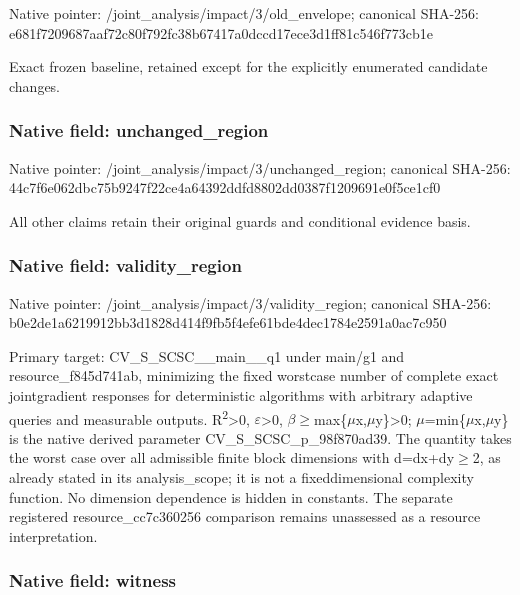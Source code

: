 \documentclass[10pt,a4paper]{article}
\begin{document}
Native pointer: /joint\_analysis/impact/3/old\_envelope; canonical SHA-256: e681f7209687aaf72c80f792\allowbreak{}fc38b67417a0dccd17ece3d1\allowbreak{}ff81c546f773cb1e


Exact frozen baseline, retained except for the explicitly enumerated candidate changes.


\subsubsection{Native field: unchanged\_region}


Native pointer: /joint\_analysis/impact/3\allowbreak{}/unchanged\_region; canonical SHA-256: 44c7f6e062dbc75b9247f22c\allowbreak{}e4a64392ddfd8802dd0387f1\allowbreak{}209691e0f5ce1cf0


All other claims retain their original guards and conditional evidence basis.


\subsubsection{Native field: validity\_region}


Native pointer: /joint\_analysis/impact/3\allowbreak{}/validity\_region; canonical SHA-256: b0e2de1a6219912bb3d1828d\allowbreak{}414f9fb5f4efe61bde4dec17\allowbreak{}84e2591a0ac7c950


Primary target: CV\_S\_SCSC\_\_main\_\_q1 under main/g1 and resource\_f845d741ab, minimizing the fixed worstcase number of complete exact jointgradient responses for deterministic algorithms with arbitrary adaptive queries and measurable outputs. R\textsuperscript{2}>0, \ensuremath{\varepsilon}>0, \ensuremath{\beta}\ensuremath{\ge}max\{\ensuremath{\mu}x,\ensuremath{\mu}y\}>0; \ensuremath{\mu}=min\{\ensuremath{\mu}x,\ensuremath{\mu}y\} is the native derived parameter CV\_S\_SCSC\_p\_98f870ad39. The quantity takes the worst case over all admissible finite block dimensions with d=dx+dy\ensuremath{\ge}2, as already stated in its analysis\_scope; it is not a fixeddimensional complexity function. No dimension dependence is hidden in constants. The separate registered resource\_cc7c360256 comparison remains unassessed as a resource interpretation.


\subsubsection{Native field: witness}
\end{document}
